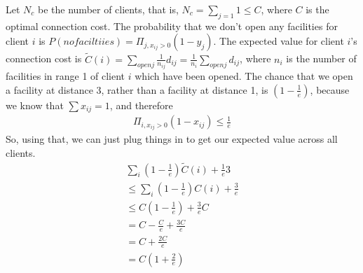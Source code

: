 \documentclass[a4paper]{article}
\begin{document}
\begin{enumerate}
\begin{enumerate}
	Let $N_c$ be the number of clients, that is, $N_c = \sum_{j=1} 1 \leq C$, where $C$ is the optimal connection cost.  The probability that we don't open any facilities for client $i$ is $P(nofaciltiies) = \Pi_{j, x_{ij} > 0}{(1-y_j)}$.  The expected value for client $i$'s connection cost is $\tilde{C}(i) = \sum_{open j} \frac{1}{n_{ij}}d_{ij} = \frac{1}{n_i}\sum_{open j}d_{ij}$, where $n_i$ is the number of facilities in range 1 of client $i$ which have been opened.  The chance that we open a facility at distance 3, rather than a facility at distance 1, is $(1 - \frac{1}{e})$, because we know that $\sum x_{ij} = 1$, and therefore
	\begin{align}
		\Pi_{i, x_{ij} >0}(1-x_{ij}) \leq \frac{1}{e}
	\end{align}
	So, using that, we can just plug things in to get our expected value across all clients.
	\begin{align}
		\sum_i (1 - \frac{1}{e}) \tilde{C}(i) + \frac{1}{e}3 \\
		\leq \sum_i (1-\frac{1}{e})C(i) + \frac{3}{e} \\
		\leq C(1 - \frac{1}{e}) + \frac{3}{e}C \\
		= C - \frac{C}{e} + \frac{3C}{e} \\
		= C + \frac{2C}{e} \\
		= C(1 + \frac{2}{e})
	\end{align}
	\end{enumerate}


\end{enumerate}
\end{document}
